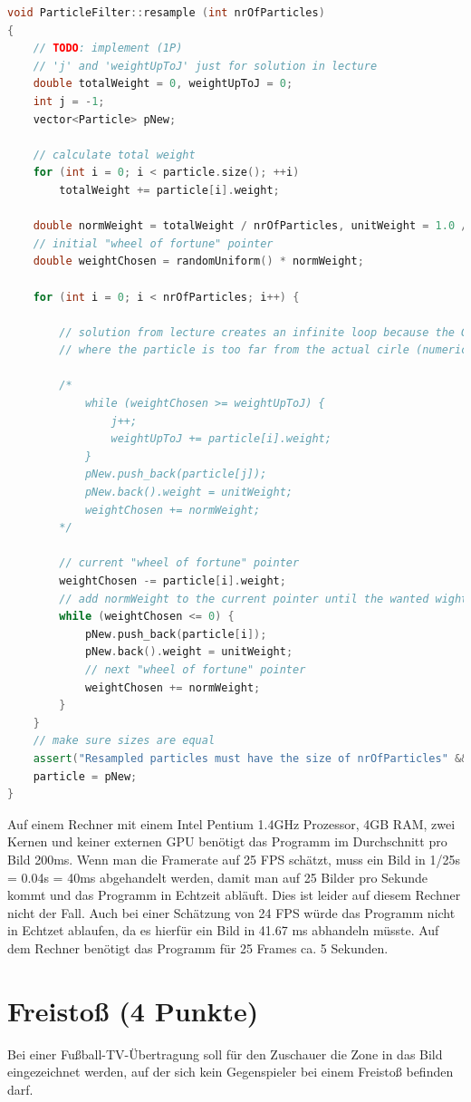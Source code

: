 \documentclass{ezb}
\begin{document}
\begin{lstlisting}[language=C++, caption=Draw particles from the particle set resetting their weight to 1.]
void ParticleFilter::resample (int nrOfParticles)
{
	// TODO: implement (1P)
	// 'j' and 'weightUpToJ' just for solution in lecture
	double totalWeight = 0, weightUpToJ = 0;
	int j = -1;
	vector<Particle> pNew;

	// calculate total weight
	for (int i = 0; i < particle.size(); ++i)
		totalWeight += particle[i].weight;

	double normWeight = totalWeight / nrOfParticles, unitWeight = 1.0 / nrOfParticles;
	// initial "wheel of fortune" pointer
	double weightChosen = randomUniform() * normWeight;

	for (int i = 0; i < nrOfParticles; i++) {

		// solution from lecture creates an infinite loop because the Gaussian distribution becomes 0 at some points
		// where the particle is too far from the actual cirle (numerical underflow)

		/*
			while (weightChosen >= weightUpToJ) {
				j++;
				weightUpToJ += particle[i].weight;
			}
			pNew.push_back(particle[j]);
			pNew.back().weight = unitWeight;
			weightChosen += normWeight;
		*/

		// current "wheel of fortune" pointer
		weightChosen -= particle[i].weight;
		// add normWeight to the current pointer until the wanted wight is archieved
		while (weightChosen <= 0) {
			pNew.push_back(particle[i]);
			pNew.back().weight = unitWeight;
			// next "wheel of fortune" pointer
			weightChosen += normWeight;
		}
	}
	// make sure sizes are equal
	assert("Resampled particles must have the size of nrOfParticles" && pNew.size() == nrOfParticles);
	particle = pNew;
}
\end{lstlisting}

Auf einem Rechner mit einem Intel Pentium 1.4GHz Prozessor, 4GB RAM, zwei Kernen und keiner externen GPU benötigt das Programm im Durchschnitt pro Bild 200ms. Wenn man die Framerate auf 25 FPS schätzt, muss ein Bild in 1/25s = 0.04s = 40ms  abgehandelt werden, damit man auf 25 Bilder pro Sekunde kommt und das Programm in Echtzeit abläuft. Dies ist leider auf diesem Rechner nicht der Fall. Auch bei einer Schätzung von 24 FPS würde das Programm nicht in Echtzet ablaufen, da es hierfür ein Bild in 41.67 ms abhandeln müsste. Auf dem Rechner benötigt das Programm für 25 Frames ca. 5 Sekunden.

\newpage
\section{Freistoß (4 Punkte)}
Bei einer Fußball-TV-Übertragung soll für den Zuschauer die Zone in das Bild eingezeichnet werden, auf der sich kein Gegenspieler bei einem Freistoß befinden darf.
\end{document}
